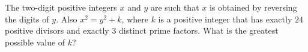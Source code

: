 The two-digit positive integers $x$ and $y$ are such that $x$ is obtained by reversing the digits of $y$. Also $x^2=y^2+k$, where $k$ is a positive integer that has exactly $24$ positive divisors and exactly $3$ distinct prime factors. What is the greatest possible value of $k$?
